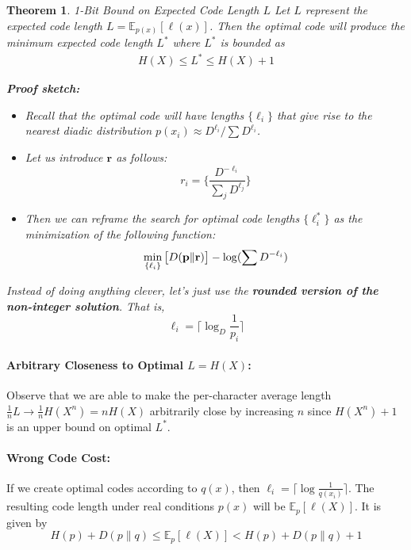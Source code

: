 \documentclass[a4paper,12pt]{report}
\newtheorem{theorem}{Theorem}
\begin{document}
\begin{theorem}{1-Bit Bound on Expected Code Length $L$}
Let $L$ represent the expected code length $L = \mathbb E_{p(x)}[\ell(x)]$. Then
the optimal code will produce the minimum expected code length $L^*$ where $L^*$
is bounded as
\begin{align}
	\label{eq:one_bit_bound}
	H(X) \leq L^* \leq H(X) + 1
\end{align}

\textbf{Proof sketch:} 
\begin{itemize}
\item Recall that the optimal code will have lengths $\{\ell_i\}$ that give rise
to the nearest diadic distribution $p(x_i) \approx D^{\ell_i} / \sum
D^{\ell_i}$. 
\item Let us introduce $\mathbf r$ as follows: 
	$$r_i = \{\frac{D^{-\ell_i}}{\sum_j D^{\ell_j}}\}$$
\item Then we can reframe the search for optimal code lengths $\{\ell_i^*\}$ as
the minimization of the following function: 
	$$\min_{\mathbf \{\ell_i\}} \big[ D(\mathbf p\| \mathbf r)\big] - \log (\sum
	D^{-\ell_i})$$
\end{itemize}

\item Instead of doing anything clever, let's just use the \textbf{rounded
version of the non-integer solution}. That is, 
	\begin{equation}
		\ell_i = \lceil \log_D \frac{1}{p_i} \rceil
	\end{equation}
\end{theorem}


\paragraph{Arbitrary Closeness to Optimal $L = H(X)$: } Observe that we are able
to make the per-character average length $\frac{1}{n} L \to \frac 1 n H(X^n) = nH(X)$
arbitrarily close by increasing $n$ since $H(X^n)+1$ is an upper bound on
optimal $L^*$.


\paragraph{Wrong Code Cost: } If we create optimal codes according to $q(x)$,
then $\ell_i = \lceil \log \frac 1 {q(x_i)} \rceil$. The resulting code length
under real conditions $p(x)$ will be $\mathbb E_p [\ell(X)]$. It is given by 
\begin{equation}
	\label{eqn:wrong_distro}
	H(p) + D(p \| q) \leq \mathbb E_p [\ell(X)] < H(p) + D(p \| q) + 1
\end{equation}
\end{document}
